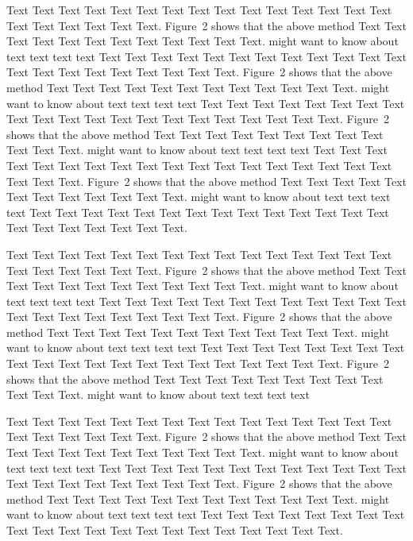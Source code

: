 \documentclass{bioinfo}
\begin{document}
\begin{methods}
Text Text Text Text Text Text  Text Text Text Text Text Text Text
Text Text  Text Text Text Text Text Text\vadjust{\newpage}.
Figure~2\vphantom{\ref{fig:02}} shows that the above method  Text
Text Text Text  Text Text Text Text Text Text  Text Text.
\citealp{Boffelli03} might want to know about text text text text
Text Text Text Text Text Text Text Text Text Text Text Text Text
Text Text Text Text Text Text Text Text.
Figure~2\vphantom{\ref{fig:02}} shows that the above method  Text
Text Text Text Text Text Text Text Text Text  Text Text.
\citealp{Boffelli03} might want to know about text text text text
Text Text Text Text Text Text  Text Text Text Text Text Text Text
Text Text Text Text Text Text Text Text.
Figure~2\vphantom{\ref{fig:02}} shows that the above method  Text
Text Text Text Text Text Text Text Text Text  Text Text.
\citealp{Boffelli03} might want to know about text text text text
Text Text Text Text Text Text  Text Text Text Text Text Text Text
Text Text Text Text Text Text Text Text.
Figure~2\vphantom{\ref{fig:02}} shows that the above method Text
Text Text Text Text Text Text Text Text Text Text Text.
\citealp{Boffelli03} might want to know about text text text text
Text Text Text Text Text Text  Text Text Text Text Text Text Text
Text Text Text Text Text Text Text Text.


Text Text Text Text Text Text  Text Text Text Text Text Text Text
Text Text  Text Text Text Text Text Text.
Figure~2\vphantom{\ref{fig:02}} shows that the above method  Text
Text Text Text  Text Text Text Text Text Text  Text Text.
\citealp{Boffelli03} might want to know about  text text text text
Text Text Text Text Text Text  Text Text Text Text Text Text Text
Text Text  Text Text Text Text Text Text.
Figure~2\vphantom{\ref{fig:02}} shows that the above method  Text
Text Text Text  Text Text Text Text Text Text  Text Text.
\citealp{Boffelli03} might want to know about  text text text text
Text Text Text Text Text Text Text Text Text Text Text Text Text
Text Text  Text Text Text Text Text Text.
Figure~2\vphantom{\ref{fig:02}} shows that the above method  Text
Text Text Text  Text Text Text Text Text Text  Text Text.
\citealp{Boffelli03} might want to know about  text text text text



Text Text Text Text Text Text  Text Text Text Text Text Text Text
Text Text  Text Text Text Text Text Text.
Figure~2\vphantom{\ref{fig:02}} shows that the above method  Text
Text Text Text  Text Text Text Text Text Text  Text Text.
\citealp{Boffelli03} might want to know about  text text text text
Text Text Text Text Text Text  Text Text Text Text Text Text Text
Text Text  Text Text Text Text Text Text.
Figure~2\vphantom{\ref{fig:02}} shows that the above method  Text
Text Text Text  Text Text Text Text Text Text  Text Text.
\citealp{Boffelli03} might want to know about  text text text text
Text Text Text Text Text Text Text Text Text Text Text Text Text
Text Text  Text Text Text Text Text Text.


\end{methods}
\end{document}

